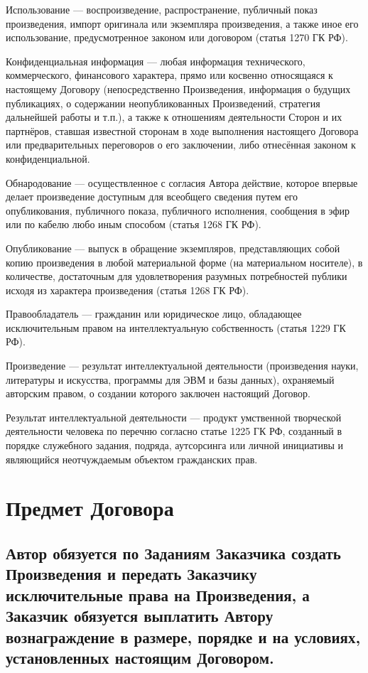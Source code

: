 \documentclass[12pt]{article}
\begin{document}
Использование --- воспроизведение, распространение, публичный показ произведения, импорт оригинала или экземпляра произведения, а также иное его использование, предусмотренное законом или договором (статья 1270 ГК РФ).

Конфиденциальная информация --- любая информация технического, коммерческого, финансового характера, прямо или косвенно относящаяся к настоящему Договору (непосредственно Произведения, информация о будущих публикациях, о содержании неопубликованных Произведений, стратегия дальнейшей работы и т.п.), а также к отношениям деятельности Сторон и их партнёров, ставшая известной сторонам в ходе выполнения настоящего Договора или предварительных переговоров о его заключении, либо отнесённая законом к конфиденциальной.

Обнародование --- осуществленное с согласия Автора действие, которое впервые делает произведение доступным для всеобщего сведения путем его опубликования, публичного показа, публичного исполнения, сообщения в эфир или по кабелю любо иным способом (статья 1268 ГК РФ).

Опубликование --- выпуск в обращение экземпляров, представляющих собой копию произведения в любой материальной форме (на материальном носителе), в количестве, достаточным для удовлетворения разумных потребностей публики исходя из характера произведения (статья 1268 ГК РФ).

Правообладатель --- гражданин или юридическое лицо, обладающее исключительным правом на интеллектуальную собственность (статья 1229 ГК РФ).

Произведение --- результат интеллектуальной деятельности (произведения науки, литературы и искусства, программы для ЭВМ и базы данных), охраняемый авторским правом, о создании которого заключен настоящий Договор.

Результат интеллектуальной деятельности --- продукт умственной творческой деятельности человека по перечню согласно статье 1225 ГК РФ, созданный в порядке служебного задания, подряда, аутсорсинга или личной инициативы и являющийся неотчуждаемым объектом гражданских прав.

\section{Предмет Договора}

\subsection{Автор обязуется по Заданиям Заказчика создать Произведения и передать Заказчику исключительные права на Произведения, а Заказчик обязуется выплатить Автору вознаграждение в размере, порядке и на условиях, установленных настоящим Договором.}
\end{document}
